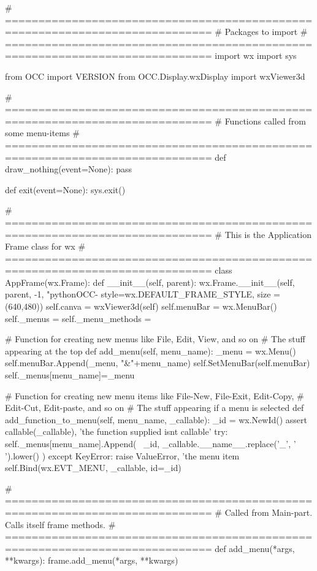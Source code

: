 \begin{python}[moreemph={[4], 46, 48},caption={Step1.py - The program frame},label=LISTING_STEP1_PY]
# =============================================================================
# Packages to import
# =============================================================================
import wx
import sys

from OCC import VERSION
from OCC.Display.wxDisplay import wxViewer3d

# =============================================================================
# Functions called from some menu-items
# =============================================================================
def draw_nothing(event=None):
    pass

def exit(event=None):
    sys.exit()

# =============================================================================
# This is the Application Frame class for wx
# =============================================================================
class AppFrame(wx.Frame):
    def __init__(self, parent):
        wx.Frame.__init__(self, 
                          parent, 
                          -1, 
                        "pythonOCC-%
                        style=wx.DEFAULT_FRAME_STYLE,
                        size = (640,480))
        self.canva = wxViewer3d(self)      
        self.menuBar = wx.MenuBar()
        self._menus = {}
        self._menu_methods = {}
    
    # Function for creating new menus like File, Edit, View, and so on
    # The stuff appearing at the top    
    def add_menu(self, menu_name):
        _menu = wx.Menu()
        self.menuBar.Append(_menu, "&"+menu_name)
        self.SetMenuBar(self.menuBar)
        self._menus[menu_name]=_menu

    # Function for creating new menu items like File-New, File-Exit, Edit-Copy, 
    # Edit-Cut, Edit-paste, and so on
    # The stuff appearing if a menu is selected
    def add_function_to_menu(self, menu_name, _callable):
        _id = wx.NewId()
        assert callable(_callable), 'the function supplied isnt callable'
        try:
            self._menus[menu_name].Append( \
                        _id, 
                        _callable.__name__.replace('_', ' ').lower() )
        except KeyError:
            raise ValueError, 'the menu item %
        self.Bind(wx.EVT_MENU, _callable, id=_id)


# =============================================================================
# Called from Main-part. Calls itself frame methods.
# =============================================================================
def add_menu(*args, **kwargs):
    frame.add_menu(*args, **kwargs)
    

\end{python}
